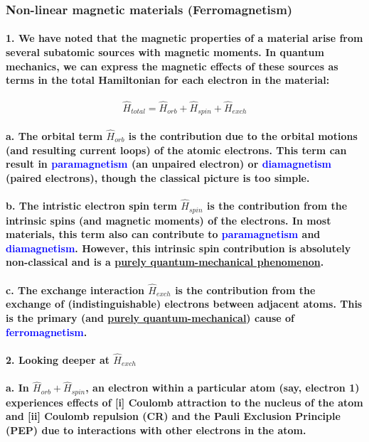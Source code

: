 \documentclass{article}
\begin{document}
\subsubsection{Non-linear magnetic materials (Ferromagnetism)}
\paragraph{1. We have noted that the magnetic properties of a material arise from several subatomic sources with magnetic moments. In quantum mechanics, we can express the magnetic effects of these sources as terms in the total Hamiltonian for each electron in the material:}
\begin{equation*}
    \hat{H}_{total}=\hat{H}_{orb}+\hat{H}_{spin}+\hat{H}_{exch}
\end{equation*}
\paragraph{\indent a. The orbital term $\hat{H}_{orb}$ is the contribution due to the orbital motions (and resulting current loops) of the atomic electrons. This term can result in \textcolor{blue}{paramagnetism} (an unpaired electron) or \textcolor{blue}{diamagnetism} (paired electrons), though the classical picture is too simple.}
\paragraph{\indent b. The intristic electron spin term $\hat{H}_{spin}$ is the contribution from the intrinsic spins (and magnetic moments) of the electrons. In most materials, this term also can contribute to \textcolor{blue}{paramagnetism} and \textcolor{blue}{diamagnetism}. However, this intrinsic spin contribution is absolutely non-classical and is a \underline{purely quantum-mechanical phenomenon}.}
\paragraph{\indent c. The exchange interaction $\hat{H}_{exch}$ is the contribution from the exchange of (indistinguishable) electrons between adjacent atoms. This is  the primary (and \underline{purely quantum-mechanical}) cause of \textcolor{blue}{ferromagnetism}.}
\paragraph{2. Looking deeper at $\hat{H}_{exch}$ }
\paragraph{\indent a. In $\hat{H}_{orb}+\hat{H}_{spin}$, an electron within a particular atom (say, electron 1) experiences effects of [i] Coulomb attraction to the nucleus of the atom and [ii] Coulomb repulsion (CR) and the Pauli Exclusion Principle (PEP) due to interactions with other electrons in the atom.}
\end{document}
